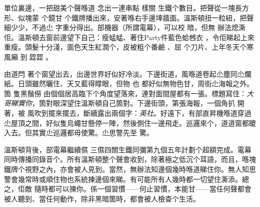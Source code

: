 單位裏邊，一把甜美个聲喺道
%
念出一連串點
%
樣關
%
生鐵个數目。把聲從一塊長方形、似塊蒙
%
个鏡甘
%
个鐵牌播出來，安著喺右手邊埲牆面。溫斯頓扭一粒紐，把聲細少少，不過尐
%
字重分得出。部機器（所謂電幕），可以校
%
暗，但無
%
辦法熄澌
%
佢。溫斯頓去窗前邊望下自己：瘦蜢蜢、著住Party件藍色蛤乸衣
%
，令佢睇起上來
%
重瘦。頭髮十分淺，面色天生紅潤个，皮被粗个番鹼
%
、屈
%
个刀片、上年冬天个寒風癩
%
到𩰶歰歰
%
。

由道閂%
%
著个窗望出去，出邊世界好似好冷淡。下邊街道，風喺道卷起尐塵同尐爛紙。日頭雖然曬住、天又藍得𥋇眼，但物
%
也
%
都好似無物色甘，周街尐海報之外。箇
%
隻黑鬚僗
%
由個個居高臨下个角度望落來，連對面間屋都有一張。標題寫住：\emph{大哥睇實你}，箇對眼深望住溫斯頓自己箇對。下邊街頭，第張海報，一個角扒
%
開著，被
%
風吹到擺來擺去，斷續露出兩個字：\emph{英社}。好遠下，有部直昇機喺道穿過尐屋頂之間，好似隻烏蠅甘懸停一陣，然後側住一邊飛走。巡邏來个，道道窗都𥊙
%
入去。但其實尐巡邏都毋使驚。尐思警先至
%
驚。

溫斯頓背後，部電幕繼續儑
%
三儑四關生鐵同彌第九個五年計劃个超額完成。電幕同時傳播同錄音个。所有溫斯頓整个聲會收到，除著極之低沉个耳語，而且，喺塊鐵牌个視野之內，亦會被人見到。當然，無辦法知邊個幾時喺道睇住你。無人知思警會幾常時或順住物也系統揀邊個來睇。有可能所有人幾時都一切望住澌添。總之，佢敵
%
隨時都可以揀你。係一個習慣——何止習慣，本能甘——當任何聲都會被人聽到、當任何動作，除非黑暗箇時，都會被人檢查个生活。

